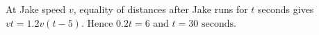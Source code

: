 At Jake speed $v$, equality of distances after Jake runs for $t$ seconds gives $vt=1.2v(t-5)$. Hence $0.2t=6$ and $\boxed{t=30\text{ seconds}}$.
